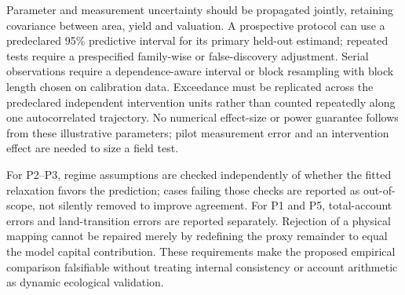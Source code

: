 Parameter and measurement uncertainty should be propagated jointly, retaining covariance between area, yield and valuation. A prospective protocol can use a predeclared 95\% predictive interval for its primary held-out estimand; repeated tests require a prespecified family-wise or false-discovery adjustment. Serial observations require a dependence-aware interval or block resampling with block length chosen on calibration data. Exceedance must be replicated across the predeclared independent intervention units rather than counted repeatedly along one autocorrelated trajectory. No numerical effect-size or power guarantee follows from these illustrative parameters; pilot measurement error and an intervention effect are needed to size a field test.

For P2--P3, regime assumptions are checked independently of whether the fitted relaxation favors the prediction; cases failing those checks are reported as out-of-scope, not silently removed to improve agreement. For P1 and P5, total-account errors and land-transition errors are reported separately. Rejection of a physical mapping cannot be repaired merely by redefining the proxy remainder to equal the model capital contribution. These requirements make the proposed empirical comparison falsifiable without treating internal consistency or account arithmetic as dynamic ecological validation.
